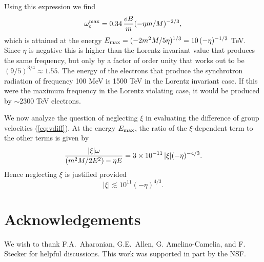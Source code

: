 \documentclass[12pt]{article}
\begin{document}
Using this expression we find
%
\begin{equation}
\omega_c^{\rm max}=0.34 \, \frac{eB}{m}(-\eta
m/M)^{-2/3},\label{eq:opeaklv2}
\end{equation}
%
which is attained at the energy $E_{\rm
  max}=(-2m^2M/5\eta)^{1/3}=10\, (-\eta)^{-1/3}$
TeV. Since $\eta$ is negative this is higher than the
Lorentz invariant value that produces the same frequency,
but only by a factor of order unity that works out to be
$(9/5)^{3/4}\approx 1.55$. The energy of the electrons
that produce the synchrotron radiation of frequency 100
MeV is 1500 TeV in the Lorentz invariant case. If this
were the maximum frequency in the Lorentz violating case,
it would be produced by $\sim 2300$ TeV electrons.

We now analyze the question of neglecting $\xi$ in
evaluating the difference of group velocities
(\ref{eq:vdiff}). At the energy $E_{\rm max}$, the ratio
of the $\xi$-dependent term to the other terms is given
by
%
\begin{equation}
\frac{|\xi|\omega}{(m^2M/2E^2) - \eta E} = 3\times 10^{-11}\,
|\xi|(-\eta)^{-4/3}.\label{eq:ratio}
\end{equation}
%
Hence neglecting $\xi$ is justified provided
%
\begin{equation}
|\xi|\lesssim 10^{11}(-\eta)^{4/3}. \label{eq:xineglect}
\end{equation}
%

\section*{Acknowledgements}

We wish to thank F.A.~Aharonian, G.E.~Allen, G. Amelino-Camelia,
and F. Stecker for helpful discussions. This work was supported in
part by the NSF.
\end{document}
